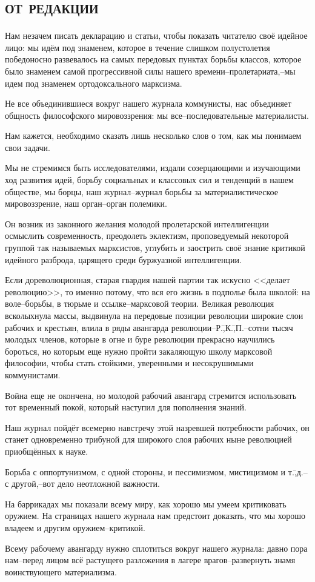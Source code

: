 \newpage
\section*{\textsc{от редакции}}
\label{sec:0}

Нам незачем писать декларацию и статьи, чтобы показать читателю своё идейное лицо: мы идём под знаменем, которое в течение слишком полустолетия победоносно развевалось на самых передовых пунктах борьбы классов, которое было знаменем самой прогрессивной силы нашего времени\---пролетариата,\---мы идем под знаменем ортодоксального марксизма.

Не все объединившиеся вокруг нашего журнала коммунисты, нас объединяет общность философского мировоззрения: мы все\---последовательные материалисты.

Нам кажется, необходимо сказать лишь несколько слов о том, как мы понимаем свои задачи.

Мы не стремимся быть исследователями, издали созерцающими и изучающими ход развития идей, борьбу социальных и классовых сил и тенденций в нашем обществе, мы борцы, наш журнал\---журнал борьбы за материалистическое мировоззрение, наш орган\---орган полемики.

Он возник из законного желания молодой пролетарской интеллигенции осмыслить современность, преодолеть эклектизм, проповедуемый некоторой группой так называемых марксистов, углубить и заострить своё знание критикой идейного разброда, царящего среди буржуазной интеллигенции.

Если дореволюционная, старая гвардия нашей партии так искусно <<делает революцию>>, то именно потому, что вся его жизнь в подполье была школой: на воле\---борьбы, в тюрьме и ссылке\---марксовой теории. Великая революция всколыхнула массы, выдвинула на передовые позиции революции широкие слои рабочих и крестьян, влила в ряды авангарда революции\---Р.\=,К.\=,П.\---сотни тысяч молодых членов, которые в огне и буре революции прекрасно научились бороться, но которым еще нужно пройти закаляющую школу марксовой философии, чтобы стать стойкими, уверенными и несокрушимыми коммунистами.

Война еще не окончена, но молодой рабочий авангард стремится использовать тот временный покой, который наступил для пополнения знаний.

Наш журнал пойдёт всемерно навстречу этой назревшей потребности рабочих, он станет одновременно трибуной для широкого слоя рабочих ныне революцией приобщённых к науке.

Борьба с оппортунизмом, с одной стороны, и пессимизмом, мистицизмом и т.\=,д.\---с другой,\---вот дело неотложной важности.

На баррикадах мы показали всему миру, как хорошо мы умеем критиковать оружием. На страницах нашего журнала нам предстоит доказать, что мы хорошо владеем и другим оружием\---критикой.

Всему рабочему авангарду нужно сплотиться вокруг нашего журнала: давно пора нам\---перед лицом всё растущего разложения в лагере врагов\---развернуть знамя воинствующего материализма.


